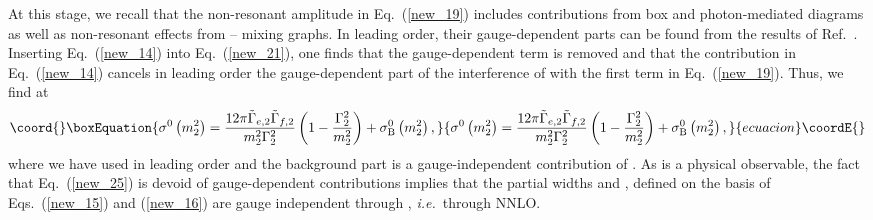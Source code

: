 \documentclass[a4paper,12pt]{article}
\begin{document}
At this stage, we recall that the non-resonant amplitude \coordHE{} in
Eq.~(\ref{new_19}) includes contributions from box and photon-mediated
diagrams as well as non-resonant effects from \myHighlight{$\gamma$}\coordHE{}--\coordHE{} mixing graphs.
In leading order, their gauge-dependent parts can be found from the results of
Ref.~\cite{deg}.
Inserting Eq.~(\ref{new_14}) into Eq.~(\ref{new_21}), one finds that the
gauge-dependent \coordHE{} term is removed and that the \coordHE{}
contribution in Eq.~(\ref{new_14}) cancels in leading order the
gauge-dependent part of the interference of \coordHE{} with the first term in
Eq.~(\ref{new_19}).
Thus, we find at \coordHE{} 
\begin{equation}\coord{}\boxEquation{
\label{new_25}
\sigma^0\left(m^2_2\right)
=\frac{12\pi\tilde\Gamma_{e,2}\tilde\Gamma_{f,2}}{m^2_2\Gamma^2_2}
\left(1-\frac{\Gamma^2_2}{m^2_2}\right)+\sigma_{\rm B}^0\left(m^2_2\right),
}{
\sigma^0\left(m^2_2\right)
=\frac{12\pi\tilde\Gamma_{e,2}\tilde\Gamma_{f,2}}{m^2_2\Gamma^2_2}
\left(1-\frac{\Gamma^2_2}{m^2_2}\right)+\sigma_{\rm B}^0\left(m^2_2\right),
}{ecuacion}\coordE{}\end{equation}
where we have used \coordHE{} in leading 
order and the background part \coordHE{} is a gauge-independent
contribution of \coordHE{}.
As \coordHE{} is a physical observable, the fact that Eq.~(\ref{new_25}) is
devoid of gauge-dependent contributions implies that the partial widths 
\coordHE{} and \coordHE{}, defined on the basis of
Eqs.~(\ref{new_15}) and (\ref{new_16}) are gauge independent through \coordHE{},
{\it i.e.}\ through NNLO.
\end{document}
